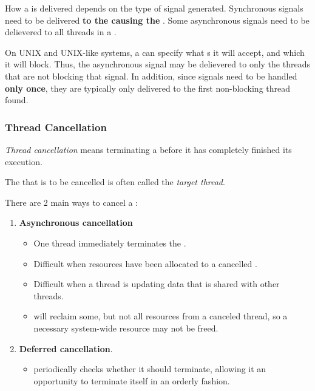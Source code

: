 How a  is delivered depends on the type of signal generated.
Synchronous signals need to be delivered \textbf{to the  causing the }.
Some asynchronous signals need to be delievered to all threads in a .

On UNIX and UNIX-like systems, a  can specify what s it will accept, and which it will block.
Thus, the asynchronous signal may be delievered to only the threads that are not blocking that signal.
In addition, since signals need to be handled \textbf{only once}, they are typically only delivered to the first non-blocking thread found.

\subsubsection{Thread Cancellation}\label{subsubsec:Thread_Cancellation}
\begin{definition}\label{def:Thread_Cancellation}
  \emph{Thread cancellation} means terminating a  before it has completely finished its execution.

  \begin{remark}\label{rmk:Target_Thread}
    The  that is to be cancelled is often called the \emph{target thread}.
  \end{remark}
\end{definition}

There are 2 main ways to cancel a :
\begin{enumerate}[noitemsep]
\item \textbf{Asynchronous cancellation}
  \begin{itemize}[noitemsep]
  \item One thread immediately terminates the .
  \item Difficult when resources have been allocated to a cancelled .
  \item Difficult when a thread is updating data that is shared with other threads.
  \item {} will reclaim some, but not all resources from a canceled thread, so a necessary system-wide resource may not be freed.
  \end{itemize}

\item \textbf{Deferred cancellation}.
  \begin{itemize}[noitemsep]
  \item {} periodically checks whether it should terminate, allowing it an opportunity to terminate itself in an orderly fashion.
  \end{itemize}
\end{enumerate}

